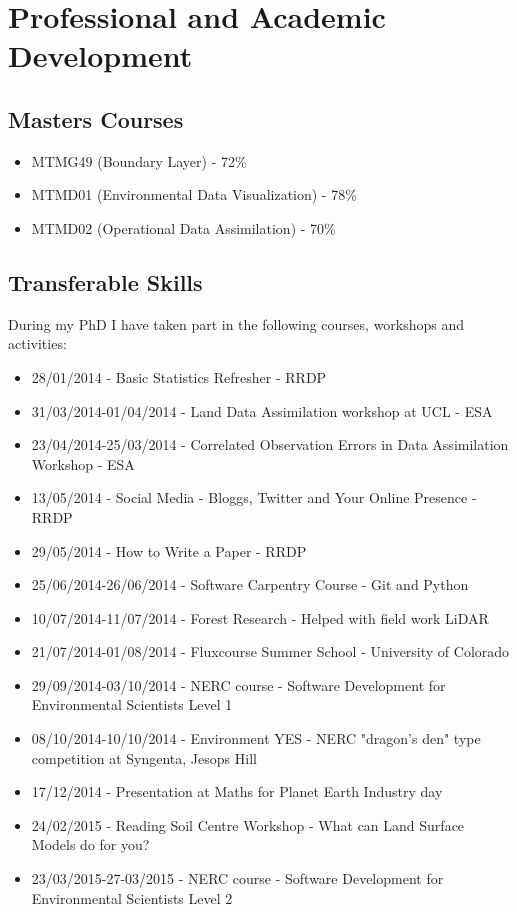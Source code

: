 \documentclass[11pt]{article}
\begin{document}
\section{Professional and Academic Development}

\subsection{Masters Courses}
\begin{itemize}
\item MTMG49 (Boundary Layer) - 72\%
\item MTMD01 (Environmental Data Visualization) - 78\%
\item MTMD02 (Operational Data Assimilation) - 70\%
\end{itemize}

\subsection{Transferable Skills}

During my PhD I have taken part in the following courses, workshops and activities:
\begin{itemize}
\item 28/01/2014 - Basic Statistics Refresher - RRDP

\item 31/03/2014-01/04/2014 - Land Data Assimilation workshop at UCL - ESA

\item 23/04/2014-25/03/2014 - Correlated Observation Errors in Data Assimilation Workshop - ESA

\item 13/05/2014 - Social Media - Bloggs, Twitter and Your Online Presence - RRDP

\item 29/05/2014 - How to Write a Paper - RRDP

\item 25/06/2014-26/06/2014 - Software Carpentry Course - Git and Python

\item 10/07/2014-11/07/2014 - Forest Research - Helped with field work LiDAR

\item  21/07/2014-01/08/2014 - Fluxcourse Summer School - University of Colorado

\item 29/09/2014-03/10/2014 - NERC course - Software Development for Environmental Scientists Level 1

\item 08/10/2014-10/10/2014 - Environment YES - NERC "dragon's den" type competition at Syngenta, Jesops Hill

\item 17/12/2014 - Presentation at Maths for Planet Earth Industry day

\item 24/02/2015 - Reading Soil Centre Workshop - What can Land Surface Models do for you?

\item 23/03/2015-27-03/2015 - NERC course - Software Development for Environmental Scientists Level 2
\end{itemize}
\end{document}
